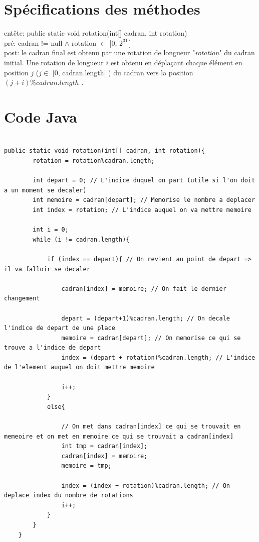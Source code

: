 \documentclass[a4paper, 12pt]{article}
\begin{document}
\newpage
\section{Spécifications des méthodes}

entête: public static void rotation(int[] cadran, int rotation)\\

pré: cadran != null $\wedge$ rotation $\in$ [0, $2^{31}$[\\

post: le cadran final est obtenu par une rotation de longueur "\textit{rotation}" du cadran initial. Une rotation de longueur $i$ est obtenu en déplaçant chaque élément en position $j$ ($j \in$ [0, cadran.length[ ) du cadran vers la position $(j+i)\%cadran.length$ .

\newpage
\section{Code Java}



\begin{lstlisting}[frame=single]

public static void rotation(int[] cadran, int rotation){
        rotation = rotation%cadran.length;
        
        int depart = 0; // L'indice duquel on part (utile si l'on doit a un moment se decaler)
        int memoire = cadran[depart]; // Memorise le nombre a deplacer
        int index = rotation; // L'indice auquel on va mettre memoire
        
        int i = 0;
        while (i != cadran.length){
            
            if (index == depart){ // On revient au point de depart => il va falloir se decaler
                
                cadran[index] = memoire; // On fait le dernier changement

                depart = (depart+1)%cadran.length; // On decale l'indice de depart de une place
                memoire = cadran[depart]; // On memorise ce qui se trouve a l'indice de depart
                index = (depart + rotation)%cadran.length; // L'indice de l'element auquel on doit mettre memoire
                
                i++;
            }
            else{
                
                // On met dans cadran[index] ce qui se trouvait en memeoire et on met en memoire ce qui se trouvait a cadran[index]
                int tmp = cadran[index];
                cadran[index] = memoire;
                memoire = tmp;
                
                index = (index + rotation)%cadran.length; // On deplace index du nombre de rotations
                i++;
            }
        }
	}

\end{lstlisting} 
\end{document}

